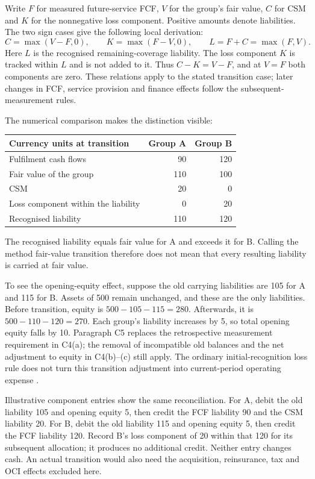 Write $F$ for measured future-service FCF, $V$ for the group's fair value,
$C$ for CSM and $K$ for the nonnegative loss component. Positive amounts
denote liabilities. The two sign cases give the following local derivation:
\[
 C=\max(V-F,0),\qquad K=\max(F-V,0),\qquad
 L=F+C=\max(F,V).
\]
Here $L$ is the recognised remaining-coverage liability. The loss component
$K$ is tracked within $L$ and is not added to it. Thus $C-K=V-F$, and at
$V=F$ both components are zero. These relations apply to the stated
transition case; later changes in FCF, service provision and finance effects
follow the subsequent-measurement rules.

The numerical comparison makes the distinction visible:
\begin{center}
\begin{tabular}{lrr}
\toprule
Currency units at transition & Group A & Group B \\
\midrule
Fulfilment cash flows & 90 & 120 \\
Fair value of the group & 110 & 100 \\
CSM & 20 & 0 \\
Loss component within the liability & 0 & 20 \\
Recognised liability & 110 & 120 \\
\bottomrule
\end{tabular}
\end{center}
The recognised liability equals fair value for A and exceeds it for B.
Calling the method fair-value transition therefore does not mean that every
resulting liability is carried at fair value.

\clearpage
To see the opening-equity effect, suppose the old carrying liabilities are
105 for A and 115 for B. Assets of 500 remain unchanged, and these are the
only liabilities. Before transition, equity is $500-105-115=280$. Afterwards,
it is $500-110-120=270$. Each group's liability increases by 5, so total
opening equity falls by 10. Paragraph C5 replaces the retrospective
measurement requirement in C4(a); the removal of incompatible old balances
and the net adjustment to equity in C4(b)--(c) still apply. The ordinary
initial-recognition loss rule does not turn this transition adjustment into
current-period operating expense \citep[paragraphs C4--C5]{aasb17}.

Illustrative component entries show the same reconciliation. For A, debit
the old liability 105 and opening equity 5, then credit the FCF liability 90
and the CSM liability 20. For B, debit the old liability 115 and opening
equity 5, then credit the FCF liability 120. Record B's loss component of 20
within that 120 for its subsequent allocation; it produces no additional
credit. Neither entry changes cash. An actual transition would also need the
acquisition, reinsurance, tax and OCI effects excluded here.

